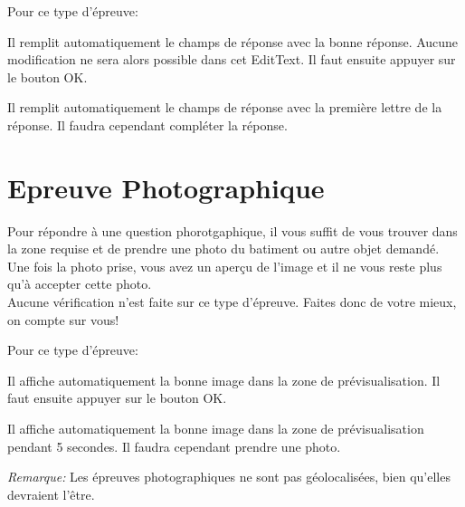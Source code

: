 \documentclass[11pt]{scrreprt}
\begin{document}
    Pour ce type d'épreuve:
        \begin{description}[style=nextline]
            \item[Bouton de triche]Il remplit automatiquement le champs de réponse avec la bonne réponse. Aucune modification ne sera alors possible dans cet EditText. Il faut ensuite appuyer sur le bouton OK.
            \item[Bouton d'aide]Il remplit automatiquement le champs de réponse avec la première lettre de la réponse. Il faudra cependant compléter la réponse.
        \end{description}

    \section{Epreuve Photographique}

    Pour répondre à une question phorotgaphique, il vous suffit de vous trouver dans la zone requise et de prendre une photo du batiment ou autre objet demandé. Une fois la photo prise, vous avez un aperçu de l'image et il ne vous reste plus qu'à accepter cette photo.\\

    Aucune vérification n'est faite sur ce type d'épreuve. Faites donc de votre mieux, on compte sur vous!

    Pour ce type d'épreuve:
    \begin{description}[style=nextline]
        \item[Bouton de triche]Il affiche automatiquement la bonne image dans la zone de prévisualisation. Il faut ensuite appuyer sur le bouton OK.
        \item[Bouton d'aide]Il affiche automatiquement la bonne image dans la zone de prévisualisation pendant 5 secondes. Il faudra cependant prendre une photo.
    \end{description}

    \textit{Remarque: }Les épreuves photographiques ne sont pas géolocalisées, bien qu'elles devraient l'être.
\end{document}
